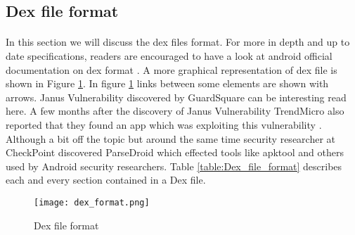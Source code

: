\documentclass[../main.tex]{subfile}
\begin{document}
			\subsection{Dex file format}
				\paragraph{} In this section we will discuss the dex files format. For more in depth and up to date specifications, readers are encouraged to have a look at android official documentation on dex format \cite{dex_format}. A more graphical representation of dex file is shown in Figure \ref{fig:dex_format}. In figure \ref{fig:dex_format} links between some elements are shown with arrows. Janus Vulnerability \cite{janus_vulnerability} discovered by GuardSquare can be interesting read here. A few months after the discovery of Janus Vulnerability TrendMicro also reported that they found an app which was exploiting this vulnerability \cite{janus_wild}. Although a bit off the topic but around the same time security researcher at CheckPoint discovered ParseDroid \cite{parsedroid} which effected tools like apktool and others used by Android security researchers. Table \ref{table:Dex_file_format} describes each and every section contained in a Dex file.
				\begin{figure}[H]
					\texttt{[image: dex\_format.png]}
					\caption{Dex file format \cite{dex_image_albertini}}
					\label{fig:dex_format}
				\end{figure}
				
\end{document}
